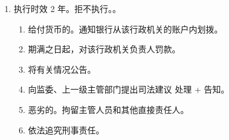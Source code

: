 \begin{enumerate}
        \begin{enumerate}
          \item 知道做啥。
                \begin{enumerate}
                  \item 履行判决。。。
                  \item 给付判决。比履行判决的内容更具体。。
                \end{enumerate}
          \item 不知做啥。
                \begin{enumerate}
                  \item 重新处理判决，。
                  \item {}。。
                \end{enumerate}
          \item 作无意义，确认违法。。
        \end{enumerate}
  \item 执行时效 2 年。拒不执行。。
        \begin{enumerate}
          \item 给付货币的。通知银行从该行政机关的账户内划拨。
          \item 期满之日起，对该行政机关负责人罚款。
          \item 将有关情况公告。
          \item 向监委、上一级主管部门提出司法建议 \yjt 处理 + 告知。
          \item 恶劣的。拘留主管人员和其他直接责任人。
          \item 依法追究刑事责任。
        \end{enumerate}
\end{enumerate}
